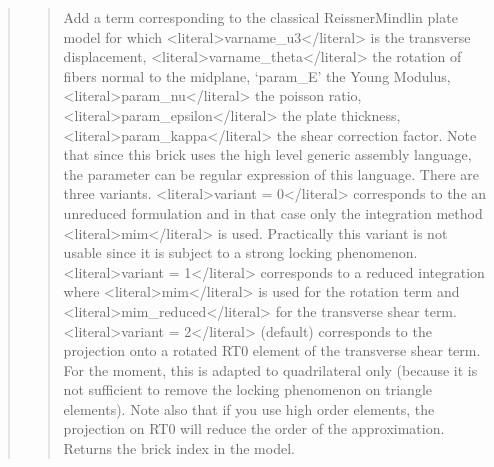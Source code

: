 \documentclass[a4paper,11pt,english]{sphinxmanual}
\begin{document}
\begin{quote}
\begin{quote}
\sphinxAtStartPar
Add a term corresponding to the classical Reissner\sphinxhyphen{}Mindlin plate
model for which \textless{}literal\textgreater{}varname\_u3\textless{}/literal\textgreater{} is the transverse displacement,
\textless{}literal\textgreater{}varname\_theta\textless{}/literal\textgreater{} the rotation of
fibers normal to the midplane, ‘param\_E’ the Young Modulus,
\textless{}literal\textgreater{}param\_nu\textless{}/literal\textgreater{} the poisson ratio,
\textless{}literal\textgreater{}param\_epsilon\textless{}/literal\textgreater{} the plate thickness,
\textless{}literal\textgreater{}param\_kappa\textless{}/literal\textgreater{} the shear correction factor. Note that since this brick
uses the high level generic assembly language, the parameter can
be regular expression of this language.
There are three variants.
\textless{}literal\textgreater{}variant = 0\textless{}/literal\textgreater{} corresponds to the an
unreduced formulation and in that case only the integration
method \textless{}literal\textgreater{}mim\textless{}/literal\textgreater{} is used. Practically this variant is not usable since
it is subject to a strong locking phenomenon.
\textless{}literal\textgreater{}variant = 1\textless{}/literal\textgreater{} corresponds to a reduced integration where \textless{}literal\textgreater{}mim\textless{}/literal\textgreater{} is
used for the rotation term and \textless{}literal\textgreater{}mim\_reduced\textless{}/literal\textgreater{} for the transverse
shear term. \textless{}literal\textgreater{}variant = 2\textless{}/literal\textgreater{} (default) corresponds to the projection onto
a rotated RT0 element of the transverse shear term. For the moment, this
is adapted to quadrilateral only (because it is not sufficient to
remove the locking phenomenon on triangle elements). Note also that if
you use high order elements, the projection on RT0 will reduce the order
of the approximation.
Returns the brick index in the model.
\end{quote}

\sphinxAtStartPar
{}
\begin{quote}


\end{quote}
\end{quote}
\end{document}
